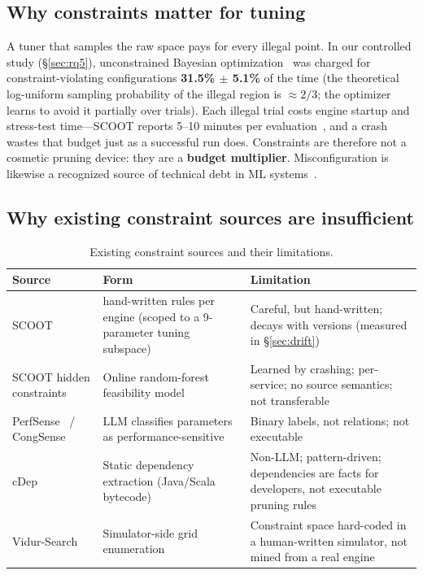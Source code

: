 \documentclass[journal]{IEEEtran}
\begin{document}
\subsection{Why constraints matter for tuning}

A tuner that samples the raw space pays for every illegal point. In our controlled study (\S\ref{sec:rq5}), unconstrained Bayesian optimization~\cite{snoek} was charged for constraint-violating configurations \textbf{31.5\% $\pm$ 5.1\%} of the time (the theoretical log-uniform sampling probability of the illegal region is ${\approx}2/3$; the optimizer learns to avoid it partially over trials). Each illegal trial costs engine startup and stress-test time---SCOOT reports 5--10 minutes per evaluation~\cite{ref2}, and a crash wastes that budget just as a successful run does. Constraints are therefore not a cosmetic pruning device: they are a \textbf{budget multiplier}. Misconfiguration is likewise a recognized source of technical debt in ML systems~\cite{sculley}.

\subsection{Why existing constraint sources are insufficient}

\begin{table}[t]
\centering
\caption{Existing constraint sources and their limitations.}
\label{tab:sources}
\footnotesize
\begin{tabular}{@{}>{\raggedright\arraybackslash}p{3.0cm}>{\raggedright\arraybackslash}p{4.6cm}>{\raggedright\arraybackslash}p{8.8cm}@{}}
\toprule
Source & Form & Limitation \\
\midrule
SCOOT~\cite{ref2} & 3 hand-written rules per engine (scoped to a 9-parameter tuning subspace) & Careful, but hand-written; decays with versions (measured in \S\ref{sec:drift}) \\
SCOOT hidden constraints~\cite{ref2} & Online random-forest feasibility model & Learned by crashing; per-service; no source semantics; not transferable \\
PerfSense~\cite{ref3} / CongSense~\cite{ref4} & LLM classifies parameters as performance-sensitive & Binary labels, not relations; not executable \\
cDep~\cite{ref5} & Static dependency extraction (Java/Scala bytecode) & Non-LLM; pattern-driven; dependencies are facts for developers, not executable pruning rules \\
Vidur-Search~\cite{ref6} & Simulator-side grid enumeration & Constraint space hard-coded in a human-written simulator, not mined from a real engine \\
\bottomrule
\end{tabular}
\end{table}
\end{document}

